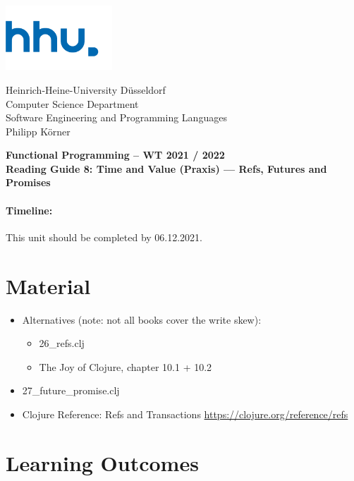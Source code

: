 \documentclass[11pt,a4paper]{article}
\begin{document}
\begin{minipage}[b]{\textwidth}
	\parbox[t]{5cm}{%
		\includegraphics[width=4cm]{unilogo}
		\hfill
	}
	\parbox[b]{11cm}{%
		Heinrich-Heine-University D\"usseldorf\\
		Computer Science Department\\
		Software Engineering and Programming Languages\\
		Philipp K\"orner
	}
\end{minipage}
\begin{center}
	\bf
	Functional Programming -- WT 2021 / 2022\\
	Reading Guide 8: Time and Value (Praxis) --- Refs, Futures and Promises
\end{center}

\pagestyle{empty}

\paragraph{Timeline:} This unit should be completed by 06.12.2021.

\section{Material} 

\begin{itemize}
    \item Alternatives (note: not all books cover the write skew):
        \begin{itemize}
            \item 26\_refs.clj
            \item The Joy of Clojure, chapter 10.1 + 10.2
        \end{itemize}
            \item 27\_future\_promise.clj
    \item Clojure Reference: Refs and Transactions \url{https://clojure.org/reference/refs}
\end{itemize}


\section{Learning Outcomes}
\end{document}
